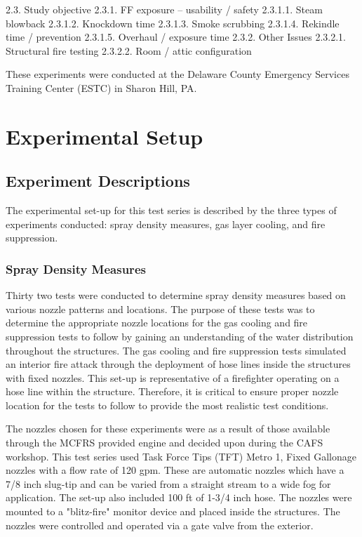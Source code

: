 \documentclass[12pt,oneside]{book}
\begin{document}
2.3. Study objective
2.3.1. FF exposure – usability / safety
2.3.1.1. Steam blowback
2.3.1.2. Knockdown time
2.3.1.3. Smoke scrubbing
2.3.1.4. Rekindle time / prevention
2.3.1.5. Overhaul / exposure time
2.3.2. Other Issues
2.3.2.1. Structural fire testing
2.3.2.2. Room / attic configuration

These experiments were conducted at the Delaware County Emergency Services Training Center (ESTC) in Sharon Hill, PA.  

\chapter{Experimental Setup}
\label{chap:Experimental_Setup}

\section{Experiment Descriptions}
\label{sec:Experiment_Descriptions}

The experimental set-up for this test series is described by the three types of experiments conducted: spray density measures, gas layer cooling, and fire suppression.

\subsection{Spray Density Measures}
\label{sec:Spray_Density_Measures}

Thirty two tests were conducted to determine spray density measures based on various nozzle patterns and locations. The purpose of these tests was to determine the appropriate nozzle locations for the gas cooling and fire suppression tests to follow by gaining an understanding of the water distribution throughout the structures. The gas cooling and fire suppression tests simulated an interior fire attack through the deployment of hose lines inside the structures with fixed nozzles. This set-up is representative of a firefighter operating on a hose line within the structure. Therefore, it is critical to ensure proper nozzle location for the tests to follow to provide the most realistic test conditions.     

The nozzles chosen for these experiments were as a result of those available through the MCFRS provided engine and decided upon during the CAFS workshop.  This test series used Task Force Tips (TFT) Metro 1, Fixed Gallonage nozzles with a flow rate of 120 gpm. These are automatic nozzles which have a 7/8 inch slug-tip and can be varied from a straight stream to a wide fog for application. The set-up also included 100 ft of 1-3/4 inch hose.  The nozzles were mounted to a "blitz-fire" monitor device and placed inside the structures.  The nozzles were controlled and operated via a gate valve from the exterior. 
\end{document}
